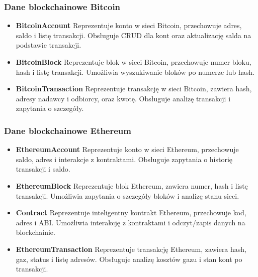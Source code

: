 \subsubsection{Dane blockchainowe Bitcoin}
\begin{itemize}
\item \textbf{BitcoinAccount} Reprezentuje konto w sieci Bitcoin, przechowuje adres, saldo i listę transakcji. Obsługuje CRUD dla kont oraz aktualizację salda na podstawie transakcji.
\item \textbf{BitcoinBlock} Reprezentuje blok w sieci Bitcoin, przechowuje numer bloku, hash i listę transakcji. Umożliwia wyszukiwanie bloków po numerze lub hash.
\item \textbf{BitcoinTransaction} Reprezentuje transakcję w sieci Bitcoin, zawiera hash, adresy nadawcy i odbiorcy, oraz kwotę. Obsługuje analizę transakcji i zapytania o szczegóły.
\end{itemize}

\subsubsection{Dane blockchainowe Ethereum}
\begin{itemize}
\item \textbf{EthereumAccount} Reprezentuje konto w sieci Ethereum, przechowuje saldo, adres i interakcje z kontraktami. Obsługuje zapytania o historię transakcji i saldo.
\item \textbf{EthereumBlock} Reprezentuje blok Ethereum, zawiera numer, hash i listę transakcji. Umożliwia zapytania o szczegóły bloków i analizę stanu sieci.
\item \textbf{Contract} Reprezentuje inteligentny kontrakt Ethereum, przechowuje kod, adres i ABI. Umożliwia interakcję z kontraktami i odczyt/zapis danych na blockchainie.
\item \textbf{EthereumTransaction} Reprezentuje transakcję Ethereum, zawiera hash, gaz, status i listę adresów. Obsługuje analizę kosztów gazu i stan kont po transakcji.
\end{itemize}

